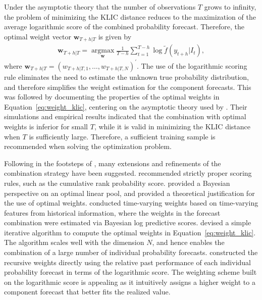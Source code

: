 \documentclass[a4paper,11pt]{article}
\begin{document}
Under the asymptotic theory that the number of observations $T$ grows to infinity, the problem of minimizing the KLIC distance reduces to the maximization of the average logarithmic score of the combined probability forecast. Therefore, the optimal weight vector $\bm{w}_{T+h|T}$ is given by
\begin{align}
  \label{eq:weight_klic}
  \bm{w}_{T+h|T} = \underset{\bm{w}}{\operatorname{argmax}} \frac{1}{T-h} \sum_{t=1}^{T-h} \log \tilde{f}(y_{t+h}|I_{t}),
\end{align}
where $\bm{w}_{T+h|T}=\left(w_{T+h|T, 1}, \dots, w_{T+h|T, N}\right)^{\prime}$. The use of the logarithmic scoring rule eliminates the need to estimate the unknown true probability distribution, and therefore simplifies the weight estimation for the component forecasts. This was followed by \citet{Pauwels2016-ci} documenting the properties of the optimal weights in Equation~\eqref{eq:weight_klic}, centering on the asymptotic theory used by \citet{Hall2007-lh}. Their simulations and empirical results indicated that the combination with optimal weights is inferior for small $T$, while it is valid in minimizing the KLIC distance when $T$ is sufficiently large. Therefore, a sufficient training sample is recommended when solving the optimization problem.

Following in the footsteps of \citet{Hall2007-lh}, many extensions and refinements of the combination strategy have been suggested. \citet{Gneiting2007-ij} recommended strictly proper scoring rules, such as the cumulative rank probability score. \citet{Geweke2011-xk} provided a Bayesian perspective on an optimal linear pool, and provided a theoretical justification for the use of optimal weights. \citet{Li2021-gk} conducted time-varying weights based on time-varying features from historical information, where the weights in the forecast combination were estimated via Bayesian log predictive scores. \citet{Conflitti2015-fq} devised a simple iterative algorithm to compute the optimal weights in Equation~\eqref{eq:weight_klic}. The algorithm scales well with the dimension $N$, and hence enables the combination of a large number of individual probability forecasts. \citet{Jore2010-yi} constructed the recursive weights directly using the relative past performance of each individual probability forecast in terms of the logarithmic score. The weighting scheme built on the logarithmic score is appealing as it intuitively assigns a higher weight to a component forecast that better fits the realized value.
\end{document}

